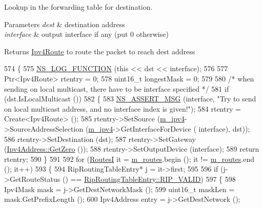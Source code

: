 Lookup in the forwarding table for destination. 


\begin{DoxyParams}{Parameters}
{\em dest} & destination address \\
\hline
{\em interface} & output interface if any (put 0 otherwise) \\
\hline
\end{DoxyParams}
\begin{DoxyReturn}{Returns}
\hyperlink{classns3_1_1Ipv4Route}{Ipv4\+Route} to route the packet to reach dest address 
\end{DoxyReturn}

\begin{DoxyCode}
574 \{
575   \hyperlink{log-macros-disabled_8h_a90b90d5bad1f39cb1b64923ea94c0761}{NS\_LOG\_FUNCTION} (\textcolor{keyword}{this} << dst << interface);
576 
577   Ptr<Ipv4Route> rtentry = 0;
578   uint16\_t longestMask = 0;
579 
580   \textcolor{comment}{/* when sending on local multicast, there have to be interface specified */}
581   \textcolor{keywordflow}{if} (dst.IsLocalMulticast ())
582     \{
583       \hyperlink{assert_8h_aff5ece9066c74e681e74999856f08539}{NS\_ASSERT\_MSG} (interface, \textcolor{stringliteral}{"Try to send on local multicast address, and no interface
       index is given!"});
584       rtentry = Create<Ipv4Route> ();
585       rtentry->SetSource (\hyperlink{classns3_1_1Rip_a6e2c0e74d2fa8643d223db26621dd7f1}{m\_ipv4}->SourceAddressSelection (\hyperlink{classns3_1_1Rip_a6e2c0e74d2fa8643d223db26621dd7f1}{m\_ipv4}->GetInterfaceForDevice (
      interface), dst));
586       rtentry->SetDestination (dst);
587       rtentry->SetGateway (\hyperlink{classns3_1_1Ipv4Address_aeeb1c76b35d4ab612fda7bc51e99c5db}{Ipv4Address::GetZero} ());
588       rtentry->SetOutputDevice (interface);
589       \textcolor{keywordflow}{return} rtentry;
590     \}
591 
592   \textcolor{keywordflow}{for} (\hyperlink{classns3_1_1Rip_a8819af4dd44f270b6b19be755b39bce8}{RoutesI} it = \hyperlink{classns3_1_1Rip_aea6c918ae311cd88fb2bfb714d6f9c30}{m\_routes}.begin (); it != \hyperlink{classns3_1_1Rip_aea6c918ae311cd88fb2bfb714d6f9c30}{m\_routes}.end (); it++)
593     \{
594       RipRoutingTableEntry* j = it->first;
595 
596       \textcolor{keywordflow}{if} (j->GetRouteStatus () == \hyperlink{classns3_1_1RipRoutingTableEntry_a4326145be5c3027f2ddf9eb80b6127a4ac29e62da26c18bf4b9caa5224cfee895}{RipRoutingTableEntry::RIP\_VALID})
597         \{
598           Ipv4Mask mask = j->GetDestNetworkMask ();
599           uint16\_t maskLen = mask.GetPrefixLength ();
600           Ipv4Address entry = j->GetDestNetwork ();

\end{DoxyCode}
